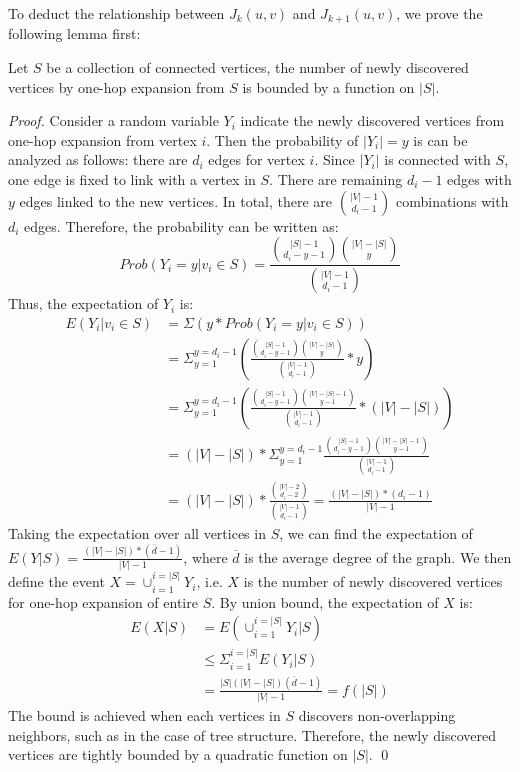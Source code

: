 To deduct the relationship between $J_k(u,v)$ and $J_{k+1}(u,v)$, we prove the following lemma first:
\begin{theorem}
Let $S$ be a collection of connected vertices, the number of newly discovered
vertices by one-hop expansion from $S$ is bounded by a function on $|S|$.
\end{theorem}
\begin{proof}
Consider a random variable $Y_i$ indicate the newly 
discovered vertices from one-hop expansion from vertex $i$. 
Then the probability of $|Y_i|=y$ is can be analyzed as follows: there 
are $d_i$ edges for vertex $i$. Since $|Y_i|$ is connected with $S$, one edge
is fixed to link with a vertex in $S$. There are remaining $d_i-1$ edges with
$y$ edges linked to the new vertices. In total, there are $|V|-1 \choose d_i -1$
combinations with $d_i$ edges. Therefore, the probability can be written as:
\begin{equation}
Prob(Y_i = y| v_i \in S) = \frac{{|S| -1 \choose d_i - y -1}{|V|-|S| \choose y}}{{|V|-1 \choose d_i -1}}
\end{equation}
Thus, the expectation of $Y_i$ is:
\begin{equation}
\begin{split}
E(Y_i|v_i \in S) & = \Sigma( y * Prob(Y_i = y| v_i \in S) )\\
	& = \Sigma_{y=1}^{y=d_i -1} ( \frac{{|S| -1 \choose d_i - y -1}{|V|-|S| \choose y}}{{|V|-1 \choose d_i -1}} * y )\\
	& = \Sigma_{y=1}^{y=d_i -1} (\frac{{|S| -1 \choose d_i - y -1}{|V|-|S| -1 \choose y - 1}}{{|V|-1 \choose d_i -1}} * (|V|-|S|))\\
	& = (|V|-|S|) * \Sigma_{y=1}^{y=d_i -1}\frac{{|S| -1 \choose d_i - y -1}{|V|-|S| -1 \choose y - 1}}{{|V|-1 \choose d_i -1}} \\
	& = (|V|-|S|) * \frac{{|V|-2 \choose d_i - 2}}{{|V|-1 \choose d_i -1}} = \frac{(|V|-|S|)*(d_i-1)}{|V| - 1}
\end{split}
\end{equation}
Taking the expectation over all vertices in $S$, we can find the expectation of $E(Y|S) = \frac{(|V|-|S|)*(\overline{d}-1)}{|V| - 1}$, 
where $\overline{d}$ is the average degree of the graph. We then define the event $X=\cup_{i=1}^{i=|S|} Y_i$, i.e. $X$ is the number
of newly discovered vertices for one-hop expansion of entire $S$. By union bound, 
the expectation of $X$ is:
\begin{equation} 
\begin{split}
E(X|S) &= E(\cup_{i=1}^{i=|S|}Y_i|S) \\
& \leq \Sigma_{i=1}^{i=|S|}E(Y_i|S) \\ 
&= \frac{|S|(|V|-|S|)(\overline{d} -1)}{|V|-1} = f(|S|)
\end{split}
\end{equation}
The bound is achieved when each vertices in $S$ discovers non-overlapping neighbors, such
as in the case of tree structure. Therefore, the newly discovered vertices are tightly bounded 
by a quadratic function on $|S|$.
\qed
\end{proof}

